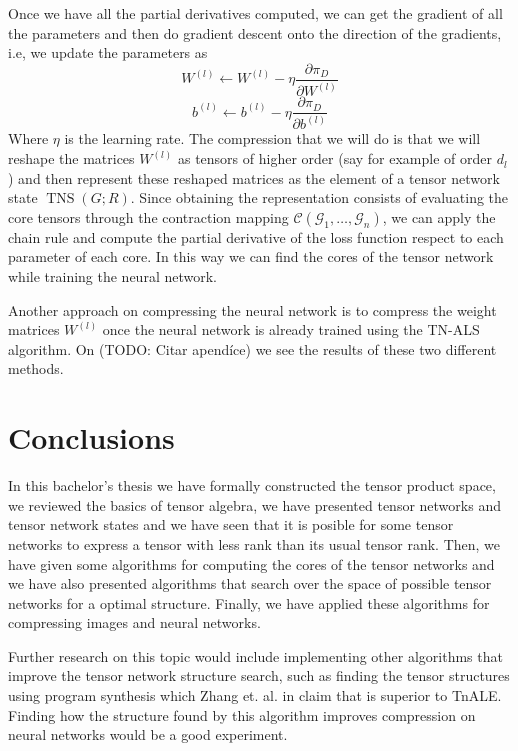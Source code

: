 \documentclass[11pt,a4paper,openright,oneside]{book}
\numberwithin{equation}{section}
\DeclareMathOperator{\TNS}{TNS}
\begin{document}
{Once we have all the partial derivatives computed, we can get the gradient of all the parameters and then do gradient descent onto the direction of
the gradients, i.e, we update the parameters as
$$W^{(l)} \leftarrow W^{(l)} - \eta \frac{\partial \pi_D}{\partial W^{(l)}}$$
$$b^{(l)} \leftarrow b^{(l)} - \eta \frac{\partial \pi_D}{\partial b^{(l)}}$$
Where $\eta$ is the learning rate. The compression that we will do is that we will reshape the matrices $W^{(l)}$ as tensors
of higher order (say for example of order $d_l$) and then represent these reshaped matrices as the element of a tensor network state
$\TNS(G; R)$. Since obtaining the representation consists of evaluating the core tensors through the contraction
mapping $\mathcal{C}(\mathcal{G}_1, \dots, \mathcal{G}_n)$, we can apply the chain rule and compute the partial derivative of the
loss function respect to each parameter of each core. In this way we can find the cores of the tensor network while training the neural network.

Another approach on compressing the neural network is to compress the weight matrices $W^{(l)}$ once the neural network is already trained using the
TN-ALS algorithm. On (TODO: Citar apendíce) we see the results of these two different methods.



\chapter{Conclusions}

In this bachelor's thesis we have formally constructed the tensor product space, we reviewed
the basics of tensor algebra, we have presented tensor networks and tensor network states and we have seen
that it is posible for some tensor networks to express a tensor with less rank than its usual tensor rank.
Then, we have given some algorithms for computing the cores of the tensor networks and we have also presented
algorithms that search over the space of possible tensor networks for a optimal structure. Finally, we have
applied these algorithms for compressing images and neural networks.

Further research on this topic would include implementing other algorithms that improve
the tensor network structure search, such as finding the tensor structures using program synthesis which
Zhang et. al. in \cite{guoTensorNetworkStructure2025} claim that is superior to TnALE. Finding how the structure
found by this algorithm improves compression on neural networks would be a good experiment.

}
\end{document}
